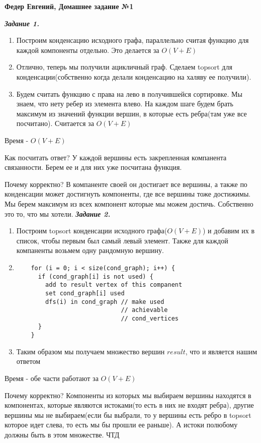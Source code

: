 \documentclass[12pt, a4paper]{scrartcl}
\begin{document}
\LARGE{\textbf{Федер Евгений, Домашнее задание №1}}\par

\emph{\textbf{Задание 1.}}\par
\begin{enumerate}
	\item Построим конденсацию исходного графа, параллельно считая функцию для каждой компоненты отдельно. Это делается за $O(V+E)$
	\item Отлично, теперь мы получили ацикличный граф. Сделаем topsort для конденсации(собственно когда делали конденсацию на халяву ее получили).
	\item Будем считать функцию с права на лево в получившейся сортировке. Мы знаем, что нету ребер из элемента влево. На каждом шаге будем брать максимум из значений функции вершин, в которые есть ребра(там уже все посчитано). Считается за $O(V+E)$
\end{enumerate}
Время - $O(V+E)$\par
Как посчитать ответ? У каждой вершины есть закрепленная компанента связанности. Берем ее и для них уже посчитана функция.\par
Почему корректно? В компаненте своей он достигает все вершины, а также по конденсации может достигнуть компоненты, где все вершины тоже достижимы. Мы берем максимум из всех компонент которые мы можем достичь. Собственно это то, что мы хотели.
\newpage\emph{\textbf{Задание 2.}}\par
\begin{enumerate}
	\item Построим topsort конденсации исходного графа($O(V+E)$) и добавим их в список, чтобы первым был самый левый элемент. Также для каждой компаненты возьмем одну рандомную вершину.
	\item
	\begin{verbatim}
	for (i = 0; i < size(cond_graph); i++) {
	  if (cond_graph[i] is not used) {
	    add to result vertex of this companent
	    set cond_graph[i] used
	    dfs(i) in cond_graph // make used 
	   	                     // achievable 
	                         // cond_vertices
	  }
	}
	\end{verbatim}
	\item Таким образом мы получаем множество вершин $result$, что и является нашим ответом	
\end{enumerate}
Время - обе части работают за $O(V+E)$\par
Почему корректно? Компоненты из которых мы выбираем вершины находятся в компонентах, которые являются истоками(то есть в них не входят ребра), другие вершины мы не выбираем(если бы выбрали, то у вершины есть ребро в topsort которое идет слева, то есть мы бы прошли ее раньше). А истоки полюбому должны быть в этом множестве. ЧТД
\end{document}
